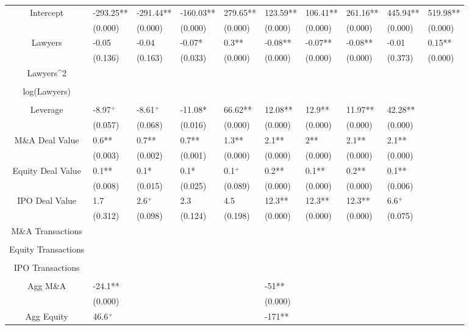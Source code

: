 \documentclass{article}
\begin{document}
\begin{table}[H]
\begin{tabular}{|clllllllll|}
Intercept & -293.25** & -291.44** & -160.03** & 279.65** & 123.59** & 106.41** & 261.16** & 445.94** & 519.98** \\
   & (0.000) & (0.000) & (0.000) & (0.000) & (0.000) & (0.000) & (0.000) & (0.000) & (0.000) \\
  Lawyers & -0.05 & -0.04 & -0.07* & 0.3** & -0.08** & -0.07** & -0.08** & -0.01 & 0.15** \\
   & (0.136) & (0.163) & (0.033) & (0.000) & (0.000) & (0.000) & (0.000) & (0.373) & (0.000) \\
  Lawyers^2 &  &  &  &  &  &  &  &  &  \\
   &  &  &  &  &  &  &  &  &  \\
  log(Lawyers) &  &  &  &  &  &  &  &  &  \\
   &  &  &  &  &  &  &  &  &  \\
  Leverage & -8.97$^{+}$ & -8.61$^{+}$ & -11.08* & 66.62** & 12.08** & 12.9** & 11.97** & 42.28** &  \\
   & (0.057) & (0.068) & (0.016) & (0.000) & (0.000) & (0.000) & (0.000) & (0.000) &  \\
  M\&A Deal Value & 0.6** & 0.7** & 0.7** & 1.3** & 2.1** & 2** & 2.1** & 2.1** &  \\
   & (0.003) & (0.002) & (0.001) & (0.000) & (0.000) & (0.000) & (0.000) & (0.000) &  \\
  Equity Deal Value & 0.1** & 0.1* & 0.1* & 0.1$^{+}$ & 0.2** & 0.1** & 0.2** & 0.1** &  \\
   & (0.008) & (0.015) & (0.025) & (0.089) & (0.000) & (0.000) & (0.000) & (0.006) &  \\
  IPO Deal Value & 1.7 & 2.6$^{+}$ & 2.3 & 4.5 & 12.3** & 12.3** & 12.3** & 6.6$^{+}$ &  \\
   & (0.312) & (0.098) & (0.124) & (0.198) & (0.000) & (0.000) & (0.000) & (0.075) &  \\
  M\&A Transactions &  &  &  &  &  &  &  &  &  \\
   &  &  &  &  &  &  &  &  &  \\
  Equity Transactions &  &  &  &  &  &  &  &  &  \\
   &  &  &  &  &  &  &  &  &  \\
  IPO Transactions &  &  &  &  &  &  &  &  &  \\
   &  &  &  &  &  &  &  &  &  \\
  Agg M\&A & -24.1** &  &  &  & -51** &  &  &  &  \\
   & (0.000) &  &  &  & (0.000) &  &  &  &  \\
  Agg Equity & 46.6$^{+}$ &  &  &  & -171** &  &  &  &  \\

\end{tabular}
\end{table}
\end{document}
